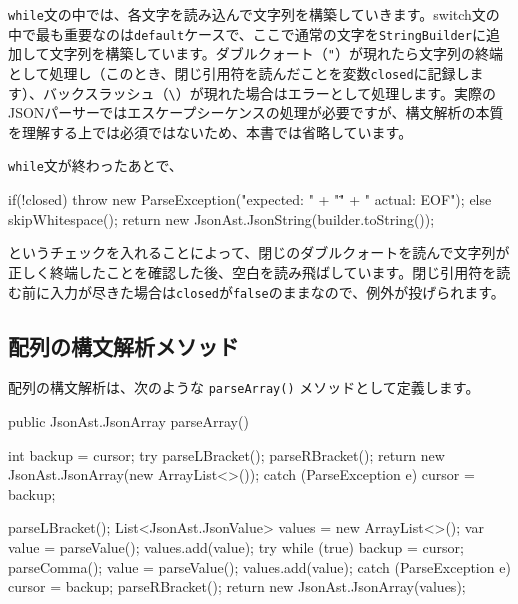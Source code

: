 \texttt{while}文の中では、各文字を読み込んで文字列を構築していきます。switch文の中で最も重要なのは\texttt{default}ケースで、ここで通常の文字を\texttt{StringBuilder}に追加して文字列を構築しています。ダブルクォート（\texttt{"}）が現れたら文字列の終端として処理し（このとき、閉じ引用符を読んだことを変数\texttt{closed}に記録します）、バックスラッシュ（\texttt{\textbackslash{}}）が現れた場合はエラーとして処理します。実際のJSONパーサーではエスケープシーケンスの処理が必要ですが、構文解析の本質を理解する上では必須ではないため、本書では省略しています。

\texttt{while}文が終わったあとで、

\begin{codescreen}{}
        if(!closed) {
            throw new ParseException("expected: " + "\"" + " actual: EOF");
        } else {
            skipWhitespace();
            return new JsonAst.JsonString(builder.toString());
        }
\end{codescreen}

\noindent というチェックを入れることによって、閉じのダブルクォートを読んで文字列が正しく終端したことを確認した後、空白を読み飛ばしています。閉じ引用符を読む前に入力が尽きた場合は\texttt{closed}が\texttt{false}のままなので、例外が投げられます。

\subsection{配列の構文解析メソッド}

配列の構文解析は、次のような \texttt{parseArray()}
メソッドとして定義します。

\begin{codescreen}{}
    public JsonAst.JsonArray parseArray() {
        int backup = cursor;
        try {
            parseLBracket();
            parseRBracket();
            return new JsonAst.JsonArray(new ArrayList<>());
        } catch (ParseException e) {
            cursor = backup;
        }

        parseLBracket();
        List<JsonAst.JsonValue> values = new ArrayList<>();
        var value = parseValue();
        values.add(value);
        try {
            while (true) {
                backup = cursor;
                parseComma();
                value = parseValue();
                values.add(value);
            }
        } catch (ParseException e) {
            cursor = backup;
            parseRBracket();
            return new JsonAst.JsonArray(values);
        }
    }
\end{codescreen}


